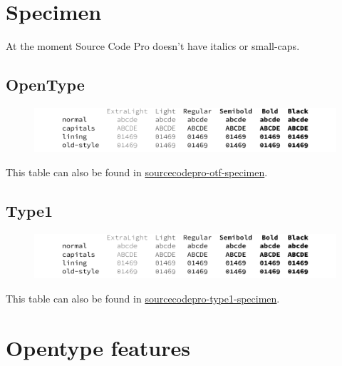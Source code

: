 \documentclass[11pt,a4paper,english]{article}
\newcommand*\file[1]{\href{run:#1.pdf}{#1}}
\begin{document}
\section{Specimen}
At the moment Source Code Pro doesn’t have italics or small-caps.
\label{sec:specimen}
\subsection{OpenType}
\begin{figure}[ht]
	\centering
	\includegraphics{sourcecodepro-otf-specimen}
\end{figure}
This table can also be found in \file{sourcecodepro-otf-specimen}.

\subsection{Type1}
\begin{figure}[ht]
	\centering
	\includegraphics{sourcecodepro-type1-specimen}
\end{figure}
This table can also be found in \file{sourcecodepro-type1-specimen}.

\newpage
\section{Opentype features}
\label{sec:otfinfo}
\end{document}
